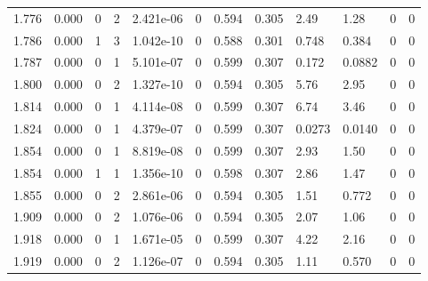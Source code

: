 \documentclass[preview]{standalone}
\begin{document}
{{{{\begin{tabular}{L{1.2cm}C{1.2cm} C{0.3cm}C{0.5cm} C{1.4cm}C{1.4cm} C{1.4cm}C{1.4cm} C{1.6cm}C{1.6cm} C{1.6cm}C{1.6cm}}
  1.776  &  0.000  & 0     &  2 &  2.421e-06  & 0  &  0.594&   0.305& 2.49 & 1.28   &  0 & 0  \\ 
  1.786  &  0.000  & 1     &  3 &  1.042e-10  & 0  &  0.588&   0.301& 0.748 & 0.384   &  0 & 0  \\ 
  1.787  &  0.000  & 0     &  1 &  5.101e-07  & 0  &  0.599&   0.307& 0.172 & 0.0882   &  0 & 0  \\ 
  1.800  &  0.000  & 0     &  2 &  1.327e-10  & 0  &  0.594&   0.305& 5.76 & 2.95   &  0 & 0  \\ 
  1.814  &  0.000  & 0     &  1 &  4.114e-08  & 0  &  0.599&   0.307& 6.74 & 3.46   &  0 & 0  \\ 
  1.824  &  0.000  & 0     &  1 &  4.379e-07  & 0  &  0.599&   0.307& 0.0273 & 0.0140   &  0 & 0  \\ 
  1.854  &  0.000  & 0     &  1 &  8.819e-08  & 0  &  0.599&   0.307& 2.93 & 1.50   &  0 & 0  \\ 
  1.854  &  0.000  & 1     &  1 &  1.356e-10  & 0  &  0.598&   0.307& 2.86 & 1.47   &  0 & 0  \\ 
  1.855  &  0.000  & 0     &  2 &  2.861e-06  & 0  &  0.594&   0.305& 1.51 & 0.772   &  0 & 0  \\ 
  1.909  &  0.000  & 0     &  2 &  1.076e-06  & 0  &  0.594&   0.305& 2.07 & 1.06   &  0 & 0  \\ 
  1.918  &  0.000  & 0     &  1 &  1.671e-05  & 0  &  0.599&   0.307& 4.22 & 2.16   &  0 & 0  \\ 
  1.919  &  0.000  & 0     &  2 &  1.126e-07  & 0  &  0.594&   0.305& 1.11 & 0.570   &  0 & 0  \\ 
\hline 
\end{tabular} 

}}}}
\end{document}
